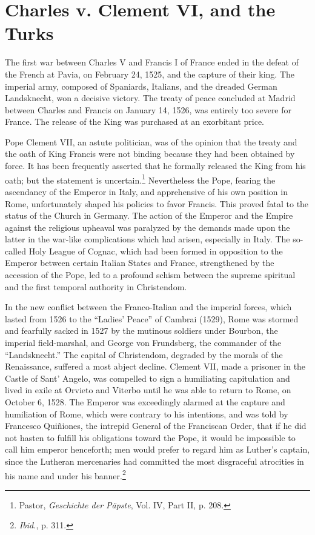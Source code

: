 \section{Charles v. Clement VI, and the Turks}

The first war between Charles V and Francis I of France ended in
the defeat of the French at Pavia, on February 24, 1525, and the capture
of their king. The imperial army, composed of Spaniards, Italians,
and the dreaded German Landsknecht, won a decisive victory. The
treaty of peace concluded at Madrid between Charles and Francis on
January 14, 1526, was entirely too severe for France. The release of
the King was purchased at an exorbitant price.

Pope Clement VII, an astute politician, was of the opinion that the
treaty and the oath of King Francis were not binding because they
had been obtained by force. It has been frequently asserted that he
formally released the King from his oath; but the statement is uncertain.\footnote
{Pastor, \textit{Geschichte der Päpste}, Vol. IV, Part II, p. 208.}
Nevertheless the Pope, fearing the ascendancy of the Emperor
in Italy, and apprehensive of his own position in Rome, unfortunately
shaped his policies to favor Francis. This proved fatal to the
status of the Church in Germany. The action of the Emperor and the
Empire against the religious upheaval was paralyzed by the demands
made upon the latter in the war-like complications which had arisen,
especially in Italy. The so-called Holy League of Cognac, which had
been formed in opposition to the Emperor between certain Italian
States and France, strengthened by the accession of the Pope, led to
a profound schism between the supreme spiritual and the first temporal
authority in Christendom.

In the new conflict between the Franco-Italian and the imperial
forces, which lasted from 1526 to the “Ladies’ Peace” of Cambrai
(1529), Rome was stormed and fearfully sacked in 1527 by the mutinous
soldiers under Bourbon, the imperial field-marshal, and George
von Frundsberg, the commander of the ``Landsknecht.'' The capital
of Christendom, degraded by the morals of the Renaissance, suffered
a most abject decline. Clement VII, made a prisoner in the Castle of
Sant’ Angelo, was compelled to sign a humiliating capitulation and
lived in exile at Orvieto and Viterbo until he was able to return to
Rome, on October 6, 1528. The Emperor was exceedingly alarmed
at the capture and humiliation of Rome, which were contrary to his
intentions, and was told by Francesco Quiñiones, the intrepid General
of the Franciscan Order, that if he did not hasten to fulfill his obligations
toward the Pope, it would be impossible to call him emperor
henceforth; men would prefer to regard him as Luther’s captain,
since the Lutheran mercenaries had committed the most disgraceful
atrocities in his name and under his banner.\footnote{\textit{Ibid.}, p. 311.}

